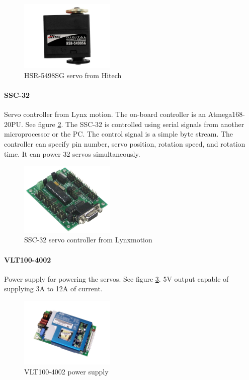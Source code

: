 \documentclass[titlepage,letterpaper,12pt]{article}
\begin{document}
\begin{figure}
  \centering
    \includegraphics[width=0.4\textwidth]{figures/191_1_HSR-5498SG_HMI_Premium_Robot_Servo-1.jpg}
  \caption{HSR-5498SG servo from Hitech\protect\cite{hsrfigcite}}
  \label{hsrfig}
\end{figure}

\paragraph{SSC-32}Servo controller from Lynx motion. The on-board controller is
an Atmega168-20PU. See figure \ref{sscfig}. The SSC-32 is controlled using
serial signals from another microprocessor or the PC. The control signal is a
simple byte stream. The controller can specify pin number, servo position,
rotation speed, and rotation time. It can power 32 servos
simultaneously\cite{servodata}.

\begin{figure}
  \centering
    \includegraphics[width=0.4\textwidth]{figures/lynxmotion-ssc-32-servo-controller-large.jpg}
  \caption{SSC-32 servo controller from Lynxmotion\protect\cite{sscfigcite}}
  \label{sscfig}
\end{figure}

\paragraph{VLT100-4002}Power supply for powering the servos. See figure
\ref{vltfig}. 5V output capable of supplying 3A to 12A of current\cite{vltdata}.

\begin{figure}
  \centering
    \includegraphics[width=0.4\textwidth]{figures/VLT100-4002.jpg}
  \caption{VLT100-4002 power supply\protect\cite{vltfigcite}}
  \label{vltfig}
\end{figure}
\end{document}
